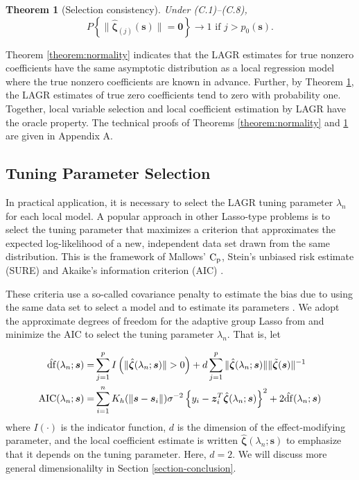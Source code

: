 \documentclass[authoryear,review, 12pt]{elsarticle}
\newtheorem{thm}{Theorem}
\begin{document}
\begin{thm}[Selection consistency]
\label{theorem:selection} Under (C.1)--(C.8), 
\[
P\left\{ \|\hat{\bm{\zeta}}_{(j)}(\bm{s})\|=\bm{0}\right\} \to1\text{ if }j>p_{0}(\bm{s}).
\]
\end{thm}
Theorem \ref{theorem:normality} indicates that the LAGR estimates
for true nonzero coefficients have the same asymptotic distribution
as a local regression model where the true nonzero coefficients are
known in advance. Further, by Theorem \ref{theorem:selection}, the
LAGR estimates of true zero coefficients tend to zero with probability
one. Together, local variable selection and local coefficient estimation by LAGR
have the oracle property. The technical proofs of Theorems \ref{theorem:normality}
and \ref{theorem:selection} are given in Appendix A.

\subsection{Tuning Parameter Selection}

In practical application, it is necessary to select the LAGR tuning
parameter $\lambda_{n}$ for each local model. A popular approach
in other Lasso-type problems is to select the tuning parameter that
maximizes a criterion that approximates the expected log-likelihood
of a new, independent data set drawn from the same distribution. This
is the framework of Mallows' ${\rm C_p}$, Stein's unbiased risk estimate (SURE)
and Akaike's information criterion (AIC) \citep{Mallows-1973,Stein-1981,Akaike-1973}.

These criteria use a so-called covariance penalty to estimate the
bias due to using the same data set to select a model and to estimate
its parameters \citep{Efron:2004a}. We adopt the approximate degrees
of freedom for the adaptive group Lasso from \citet{Yuan-Lin-2006}
and minimize the AIC to select the tuning parameter $\lambda_{n}$. That is, let

\begin{align*}
\hat{{\rm df}}(\lambda_{n};\bm{s})= & \sum_{j=1}^{p}I\left(\|\hat{\bm{\zeta}}(\lambda_{n};\bm{s})\|>0\right) + d \sum_{j=1}^{p}\|\hat{\bm{\zeta}}(\lambda_{n};\bm{s})\|\|\tilde{\bm{\zeta}}(\bm{s})\|^{-1}\\
\text{AIC}(\lambda_{n};\bm{s})= & \sum_{i=1}^{n}K_{h}(\|\bm{s}-\bm{s}_{i}\|)\sigma^{-2}\left\{ y_{i}-\bm{z}_{i}^{T}\hat{\bm{\zeta}}(\lambda_{n};\bm{s})\right\} ^{2}+2\hat{{\rm df}}(\lambda_{n};\bm{s})\\
\end{align*}
where $I\left(\cdot\right)$ is the indicator function, $d$ is the dimension of the effect-modifying parameter, and the local
coefficient estimate is written $\hat{\bm{\zeta}}(\lambda_{n};\bm{s})$
to emphasize that it depends on the tuning parameter. Here, $d=2$. We will discuss more general dimensionalilty in Section \ref{section-conclusion}.
\end{document}
